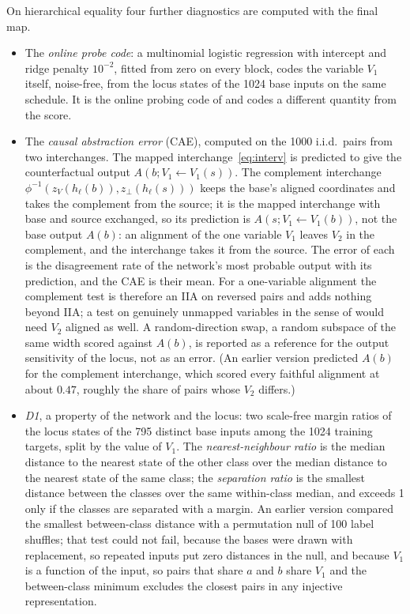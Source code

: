 \documentclass[11pt,a4paper]{article}
\begin{document}
On hierarchical equality four further diagnostics are computed with the final map.
\begin{itemize}
\item The \emph{online probe code}: a multinomial logistic regression with intercept and ridge penalty $10^{-2}$, fitted from zero on every block, codes the variable $V_1$ itself, noise-free, from the locus states of the 1024 base inputs on the same schedule. It is the online probing code of \cite{voita2020} and codes a different quantity from the score.
\item The \emph{causal abstraction error} (CAE), computed on the 1000 i.i.d.\ pairs from two interchanges. The mapped interchange~\eqref{eq:interv} is predicted to give the counterfactual output $A(b;V_1\leftarrow V_1(s))$. The complement interchange $\phi^{-1}(z_V(h_\ell(b)),z_\perp(h_\ell(s)))$ keeps the base's aligned coordinates and takes the complement from the source; it is the mapped interchange with base and source exchanged, so its prediction is $A(s;V_1\leftarrow V_1(b))$, not the base output $A(b)$: an alignment of the one variable $V_1$ leaves $V_2$ in the complement, and the interchange takes it from the source. The error of each is the disagreement rate of the network's most probable output with its prediction, and the CAE is their mean. For a one-variable alignment the complement test is therefore an IIA on reversed pairs and adds nothing beyond IIA; a test on genuinely unmapped variables in the sense of \cite{meloux2026} would need $V_2$ aligned as well. A random-direction swap, a random subspace of the same width scored against $A(b)$, is reported as a reference for the output sensitivity of the locus, not as an error. (An earlier version predicted $A(b)$ for the complement interchange, which scored every faithful alignment at about $0.47$, roughly the share of pairs whose $V_2$ differs.)
\item \emph{D1}, a property of the network and the locus: two scale-free margin ratios of the locus states of the 795 distinct base inputs among the 1024 training targets, split by the value of $V_1$. The \emph{nearest-neighbour ratio} is the median distance to the nearest state of the other class over the median distance to the nearest state of the same class; the \emph{separation ratio} is the smallest distance between the classes over the same within-class median, and exceeds 1 only if the classes are separated with a margin. An earlier version compared the smallest between-class distance with a permutation null of 100 label shuffles; that test could not fail, because the bases were drawn with replacement, so repeated inputs put zero distances in the null, and because $V_1$ is a function of the input, so pairs that share $a$ and $b$ share $V_1$ and the between-class minimum excludes the closest pairs in any injective representation.

\end{itemize}
\end{document}
